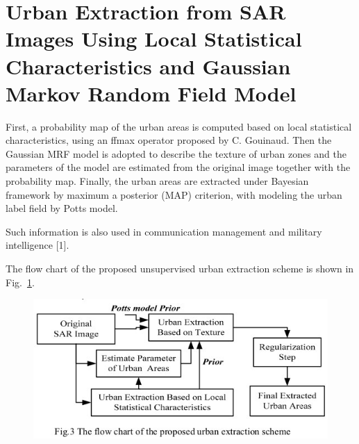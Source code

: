 \documentclass[paper=a4, fontsize=11pt]{scrartcl}
\begin{document}
\newpage

\section*{Urban Extraction from SAR Images Using Local Statistical Characteristics and Gaussian Markov Random Field Model}

First, a probability map of the urban areas is computed based on local statistical characteristics, using an ffmax operator proposed by C. Gouinaud.
Then the Gaussian MRF model is adopted to describe the texture of urban zones and the parameters of the model are estimated from the original image together with the probability map. 
Finally, the urban areas are extracted under Bayesian framework by maximum a posterior (MAP) criterion, with modeling the urban label field by Potts model.

Such information is also used in communication management and military intelligence [1].

The flow chart of the proposed unsupervised urban extraction scheme is shown in Fig.~\ref{Fig:flow}.

\begin{figure}[hbt]
	\centering
	\includegraphics[width=0.7\linewidth]{Figures/flow.jpg}
	\label{Fig:flow}
\end{figure}
\end{document}
